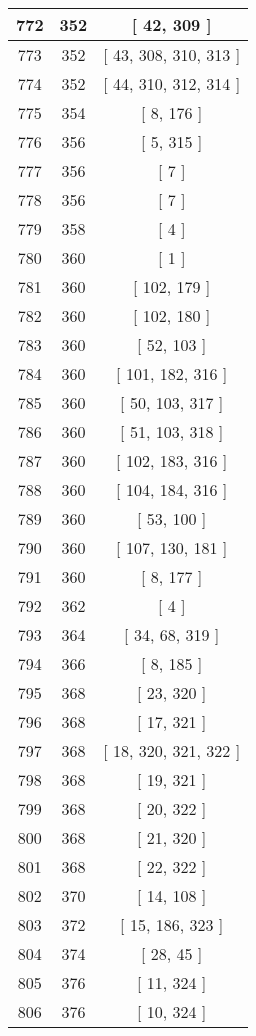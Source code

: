 \begin{center}
\begin{longtable}[H]{|| c c c ||}
\hline
772 & 352 & [ 42, 309 ] \\ 
\hline
773 & 352 & [ 43, 308, 310, 313 ] \\ 
\hline
774 & 352 & [ 44, 310, 312, 314 ] \\ 
\hline
775 & 354 & [ 8, 176 ] \\ 
\hline
776 & 356 & [ 5, 315 ] \\ 
\hline
777 & 356 & [ 7 ] \\ 
\hline
778 & 356 & [ 7 ] \\ 
\hline
779 & 358 & [ 4 ] \\ 
\hline
780 & 360 & [ 1 ] \\ 
\hline
781 & 360 & [ 102, 179 ] \\ 
\hline
782 & 360 & [ 102, 180 ] \\ 
\hline
783 & 360 & [ 52, 103 ] \\ 
\hline
784 & 360 & [ 101, 182, 316 ] \\ 
\hline
785 & 360 & [ 50, 103, 317 ] \\ 
\hline
786 & 360 & [ 51, 103, 318 ] \\ 
\hline
787 & 360 & [ 102, 183, 316 ] \\ 
\hline
788 & 360 & [ 104, 184, 316 ] \\ 
\hline
789 & 360 & [ 53, 100 ] \\ 
\hline
790 & 360 & [ 107, 130, 181 ] \\ 
\hline
791 & 360 & [ 8, 177 ] \\ 
\hline
792 & 362 & [ 4 ] \\ 
\hline
793 & 364 & [ 34, 68, 319 ] \\ 
\hline
794 & 366 & [ 8, 185 ] \\ 
\hline
795 & 368 & [ 23, 320 ] \\ 
\hline
796 & 368 & [ 17, 321 ] \\ 
\hline
797 & 368 & [ 18, 320, 321, 322 ] \\ 
\hline
798 & 368 & [ 19, 321 ] \\ 
\hline
799 & 368 & [ 20, 322 ] \\ 
\hline
800 & 368 & [ 21, 320 ] \\ 
\hline
801 & 368 & [ 22, 322 ] \\ 
\hline
802 & 370 & [ 14, 108 ] \\ 
\hline
803 & 372 & [ 15, 186, 323 ] \\ 
\hline
804 & 374 & [ 28, 45 ] \\ 
\hline
805 & 376 & [ 11, 324 ] \\ 
\hline
806 & 376 & [ 10, 324 ] \\ 

\end{longtable}
\end{center}
